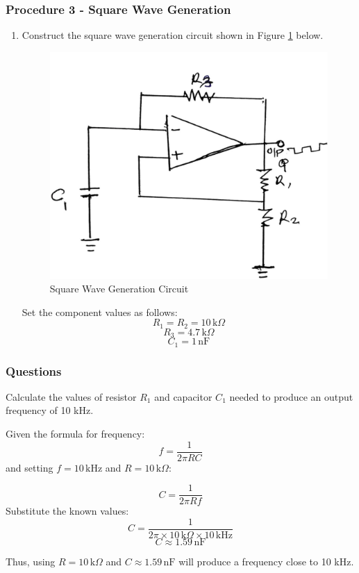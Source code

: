 \documentclass[12pt,a4paper]{article}
\begin{document}
    \subsubsection{Procedure 3 - Square Wave Generation}

    \begin{enumerate}
        \item Construct the square wave generation circuit shown in Figure \ref{fig:3} below.
        \begin{figure}[H]
            \centering
            \includegraphics[width=0.5\linewidth]{circuit3_1.jpeg}
            \caption{Square Wave Generation Circuit}
            \label{fig:3}
        \end{figure}

        Set the component values as follows:
        \[
        R_1 = R_2 = 10 \, \text{k} \Omega
        \]
        \[
        R_3 = 4.7 \, \text{k} \Omega
        \]
        \[
        C_1 = 1 \, \text{nF}
        \]
    \end{enumerate}

    \subsubsection{Questions}

    Calculate the values of resistor \( R_1 \) and capacitor \( C_1 \) needed to produce an output frequency of 10 kHz.

    Given the formula for frequency:
    \[
    f = \frac{1}{2 \pi RC}
    \]
    and setting \( f = 10 \, \text{kHz} \) and \( R = 10 \, \text{k} \Omega \):

    \[
    C = \frac{1}{2 \pi R f}
    \]
    Substitute the known values:
    \[
    C = \frac{1}{2 \pi \times 10 \, \text{k} \Omega \times 10 \, \text{kHz}}
    \]
    \[
    C \approx 1.59 \, \text{nF}
    \]

    Thus, using \( R = 10 \, \text{k} \Omega \) and \( C \approx 1.59 \, \text{nF} \) will produce a frequency close to 10 kHz.
\end{document}
